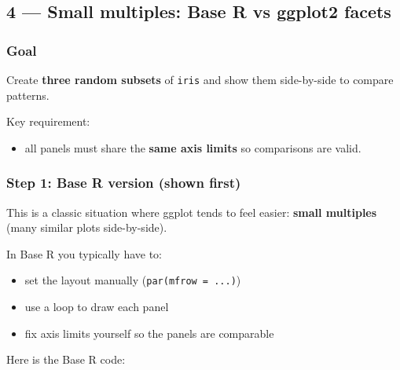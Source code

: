 \documentclass[
  letterpaper,
  DIV=11,
  numbers=noendperiod]{scrartcl}
\providecommand{\tightlist}{%
  \setlength{\itemsep}{0pt}\setlength{\parskip}{0pt}}\usepackage{longtable,booktabs,array}
\begin{document}
\subsection{4 --- Small multiples: Base R vs ggplot2
facets}\label{small-multiples-base-r-vs-ggplot2-facets}

\subsubsection{Goal}\label{goal-3}

Create \textbf{three random subsets} of \texttt{iris} and show them
side-by-side to compare patterns.

Key requirement:

\begin{itemize}
\tightlist
\item
  all panels must share the \textbf{same axis limits} so comparisons are
  valid.
\end{itemize}

\subsubsection{Step 1: Base R version (shown
first)}\label{step-1-base-r-version-shown-first-3}

This is a classic situation where ggplot tends to feel easier:
\textbf{small multiples} (many similar plots side-by-side).

In Base R you typically have to:

\begin{itemize}
\tightlist
\item
  set the layout manually (\texttt{par(mfrow\ =\ ...)})
\item
  use a loop to draw each panel
\item
  fix axis limits yourself so the panels are comparable
\end{itemize}

Here is the Base R code:
\end{document}
